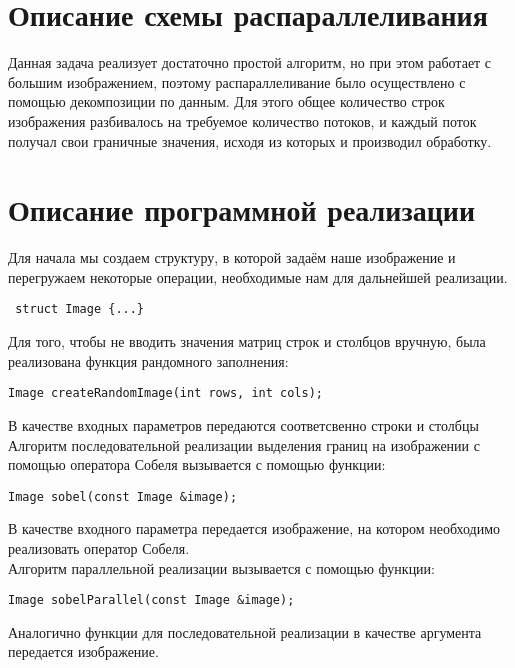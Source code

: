 \documentclass{report}
\begin{document}
\newpage

\section*{Описание схемы распараллеливания}
Данная задача реализует достаточно простой алгоритм, но при этом работает с большим изображением, поэтому распараллеливание было осуществлено с помощью
декомпозиции по данным. Для этого общее количество строк изображения разбивалось на требуемое
количество потоков, и каждый поток получал свои граничные значения, исходя из которых и производил обработку.

\newpage

\newpage
\section*{Описание программной реализации}

Для начала мы создаем структуру, в которой задаём наше изображение и перегружаем некоторые операции, необходимые нам для дальнейшей реализации.
\begin{lstlisting}
 struct Image {...}
\end{lstlisting}

Для того, чтобы не вводить значения матриц строк и столбцов вручную, была реализована функция рандомного заполнения:
\begin{lstlisting}
Image createRandomImage(int rows, int cols);
\end{lstlisting}
 В качестве входных параметров передаются соответсвенно строки и столбцы\\
 
 Алгоритм последовательной реализации выделения границ на изображении с помощью оператора Собеля вызывается с помощью функции:
 \begin{lstlisting}
Image sobel(const Image &image);
\end{lstlisting}
В качестве входного параметра передается изображение, на котором необходимо реализовать оператор Собеля.\\

Алгоритм параллельной реализации вызывается с помощью функции:
 \begin{lstlisting}
Image sobelParallel(const Image &image);
\end{lstlisting}
Аналогично функции для последовательной реализации в качестве аргумента передается изображение.
\newpage
\end{document}
